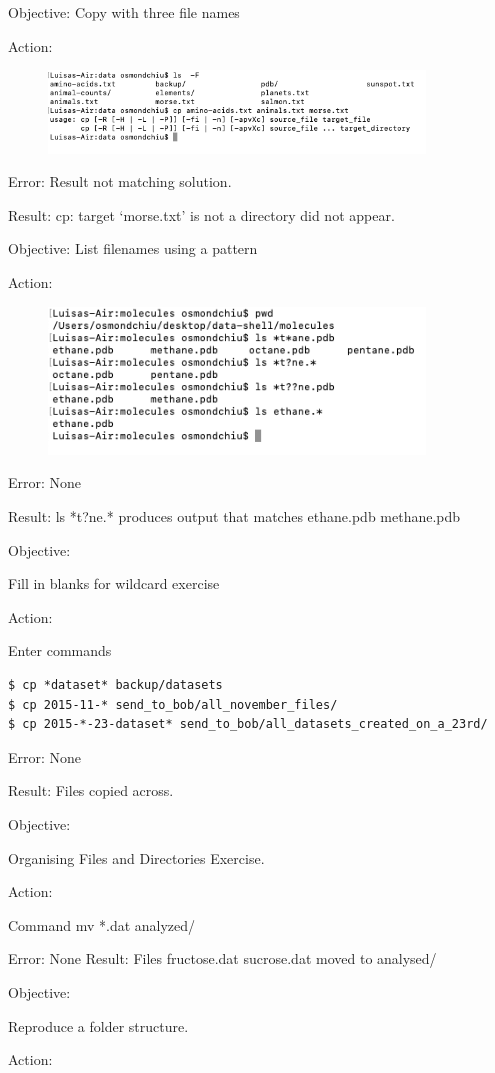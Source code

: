 \documentclass{article}
\begin{document}
Objective: Copy with three file names\par\label{sec: multiplefilenames}
Action:\par
\begin{figure}[htp]
    \centering
    \includegraphics[width=10cm]{Screenshot7.png}
    \label{fig:ls-7}
\end{figure}

Error: Result not matching solution.\par
Result: cp: target ‘morse.txt’ is not a directory did not appear.\par

Objective: List filenames using a pattern\par
Action:\par
\begin{figure}[htp]
    \centering
    \includegraphics[width=10cm]{Screenshot8.png}
    \label{fig:ls-8}
\end{figure}
Error: None\par
Result: ls *t?ne.* produces output that matches ethane.pdb methane.pdb\par

Objective:\par Fill in blanks for wildcard exercise \par
Action:\par Enter commands\par
\begin{verbatim}$ cp *dataset* backup/datasets
$ cp 2015-11-* send_to_bob/all_november_files/
$ cp 2015-*-23-dataset* send_to_bob/all_datasets_created_on_a_23rd/\end{verbatim}
Error: None\par
Result: Files copied across.\par

Objective:\par Organising Files and Directories Exercise.\par
Action:\par
Command mv *.dat analyzed/\par
Error: None
Result: Files fructose.dat sucrose.dat moved to analysed/\par
Objective:\par Reproduce a folder structure.\par
Action:\par
\end{document}
